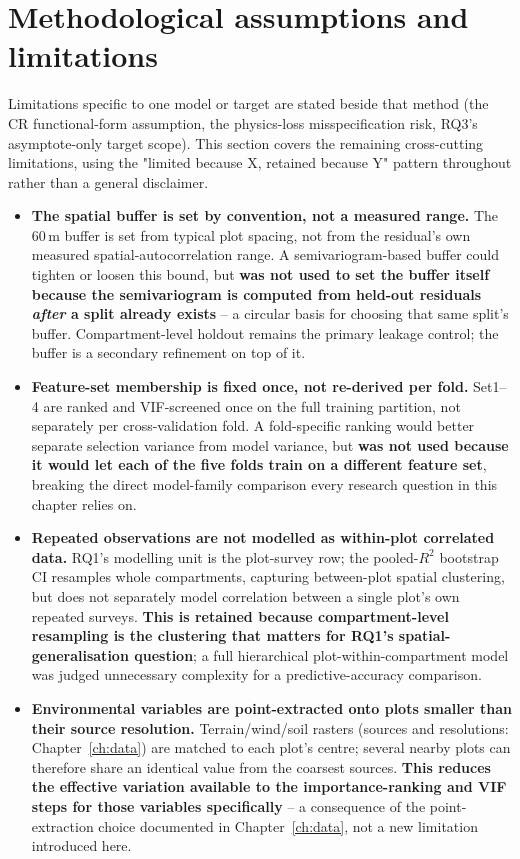 \documentclass[11pt,a4paper]{report}
\begin{document}
\section{Methodological assumptions and limitations}
\label{sec:limitations}
Limitations specific to one model or target are stated beside that method (the CR functional-form assumption, the physics-loss misspecification risk, RQ3's asymptote-only target scope). This section covers the remaining cross-cutting limitations, using the "limited because X, retained because Y" pattern throughout rather than a general disclaimer.

\begin{itemize}
\setlength\itemsep{2pt}
\item \textbf{The spatial buffer is set by convention, not a measured range.} The 60\,m buffer is set from typical plot spacing, not from the residual's own measured spatial-autocorrelation range. A semivariogram-based buffer could tighten or loosen this bound, but \textbf{was not used to set the buffer itself because the semivariogram is computed from held-out residuals \emph{after} a split already exists} -- a circular basis for choosing that same split's buffer. Compartment-level holdout remains the primary leakage control; the buffer is a secondary refinement on top of it.
\item \textbf{Feature-set membership is fixed once, not re-derived per fold.} Set1--4 are ranked and VIF-screened once on the full training partition, not separately per cross-validation fold. A fold-specific ranking would better separate selection variance from model variance, but \textbf{was not used because it would let each of the five folds train on a different feature set}, breaking the direct model-family comparison every research question in this chapter relies on.
\item \textbf{Repeated observations are not modelled as within-plot correlated data.} RQ1's modelling unit is the plot-survey row; the pooled-$R^2$ bootstrap CI resamples whole compartments, capturing between-plot spatial clustering, but does not separately model correlation between a single plot's own repeated surveys. \textbf{This is retained because compartment-level resampling is the clustering that matters for RQ1's spatial-generalisation question}; a full hierarchical plot-within-compartment model was judged unnecessary complexity for a predictive-accuracy comparison.
\item \textbf{Environmental variables are point-extracted onto plots smaller than their source resolution.} Terrain/wind/soil rasters (sources and resolutions: Chapter~\ref{ch:data}) are matched to each plot's centre; several nearby plots can therefore share an identical value from the coarsest sources. \textbf{This reduces the effective variation available to the importance-ranking and VIF steps for those variables specifically} -- a consequence of the point-extraction choice documented in Chapter~\ref{ch:data}, not a new limitation introduced here.

\end{itemize}
\end{document}
